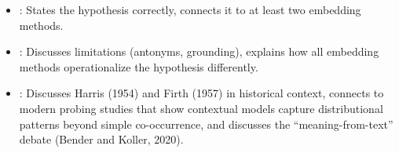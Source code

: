 \begin{interviewq}

\goodgreat
\begin{itemize}
    \item {}: States the hypothesis correctly, connects it to
    at least two embedding methods.
    \item {}: Discusses limitations (antonyms, grounding),
    explains how all embedding methods operationalize the hypothesis
    differently.
    \item {}: Discusses Harris (1954) and Firth (1957) in
    historical context, connects to modern probing studies that show
    contextual models capture distributional patterns beyond simple
    co-occurrence, and discusses the ``meaning-from-text'' debate
    (Bender and Koller, 2020).
\end{itemize}

\end{interviewq}

\vspace{0.5em}

